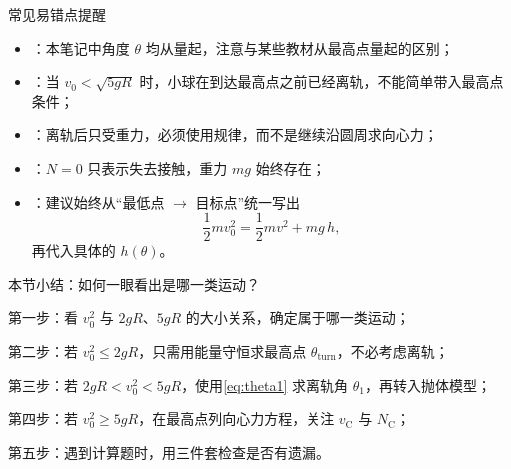 \documentclass[a4paper,11pt]{ctexart}
\begin{document}
\begin{summarybox}{常见易错点提醒}
  \begin{itemize}
    \item {}：本笔记中角度 $\theta$ 均从量起，注意与某些教材从最高点量起的区别；
    \item {}：当 $v_0<\sqrt{5gR}$ 时，小球在到达最高点之前已经离轨，不能简单带入最高点条件；
    \item {}：离轨后只受重力，必须使用规律，而不是继续沿圆周求向心力；
    \item {}：$N=0$ 只表示失去接触，重力 $mg$ 始终存在；
    \item {}：建议始终从“最低点 $\rightarrow$ 目标点”统一写出
          \[
            \frac12 m v_0^2 = \frac12 m v^2 + mg\,h,
          \]
          再代入具体的 $h(\theta)$。
  \end{itemize}
\end{summarybox}

\begin{summarybox}{本节小结：如何一眼看出是哪一类运动？}
  \begin{focuspoints}
    \item 第一步：看 $v_0^2$ 与 $2gR$、$5gR$ 的大小关系，确定属于哪一类运动；
    \item 第二步：若 $v_0^2 \le 2gR$，只需用能量守恒求最高点 $\theta_{\text{turn}}$，不必考虑离轨；
    \item 第三步：若 $2gR < v_0^2 < 5gR$，使用\eqref{eq:theta1} 求离轨角 $\theta_1$，再转入抛体模型；
    \item 第四步：若 $v_0^2 \ge 5gR$，在最高点列向心力方程，关注 $v_{\mathrm{C}}$ 与 $N_{\mathrm{C}}$；
    \item 第五步：遇到计算题时，用三件套检查是否有遗漏。
  \end{focuspoints}
\end{summarybox}
\end{document}
